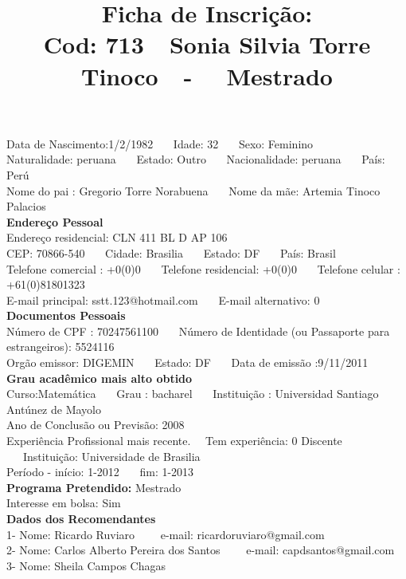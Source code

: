\documentclass[11pt]{article}
\title{\vspace*{-4cm} Ficha de Inscrição: \\Cod: 713\ \ Sonia Silvia Torre Tinoco\ \ - \ \ Mestrado 
 }
\date{}
\begin{document}
\maketitle
\vspace*{-1.5cm}
\noindent Data de Nascimento:1/2/1982
\ \ \ Idade: 32   \ \ \ Sexo: Feminino
\\
Naturalidade: peruana  
\ \ \  Estado: Outro
\ \ \  Nacionalidade: peruana
\ \ \ País: Perú
\\        
Nome do pai : Gregorio Torre Norabuena
\ \ \ Nome da mãe: Artemia Tinoco Palacios          
\\[0.2cm]                     
\textbf{Endereço Pessoal} 
\\ 
\noindent Endereço residencial: CLN 411 BL D AP 106
\\
        CEP: 70866-540 
\ \ \ Cidade: Brasilia 
\ \ \ Estado: DF 
\ \ \ País: Brasil
\\		
		Telefone comercial : +0(0)0
\ \ \ Telefone residencial: +0(0)0
\ \ \ Telefone celular : +61(0)81801323
\\
E-mail principal: sstt.123@hotmail.com
\ \ \ E-mail alternativo: 0 
\\[0.2cm] 
\textbf{Documentos Pessoais}
\\
\noindent Número de CPF : 70247561100
\ \ \ Número de Identidade (ou Passaporte para estrangeiros): 5524116
\\
Orgão emissor: DIGEMIN
\ \ \ Estado: DF
\ \ \ Data de emissão :9/11/2011
\\[0.3cm]
\textbf{Grau acadêmico mais alto obtido}
\\	
Curso:Matemática
\ \ \ Grau : bacharel
\ \ \ Instituição : Universidad Santiago Antúnez de Mayolo
\\			
Ano de Conclusão ou Previsão: 2008
\\ 
Experiência Profissional mais recente. \ \  
Tem experiência: 0 Discente  
\ \ \ Instituição: Universidade de Brasilia
\\  
Período - início: 1-2012
\ \ \ fim: 1-2013
\\[0.2cm] 
\textbf{Programa Pretendido:} Mestrado\\
Interesse em bolsa: Sim
\\[0.3cm]		
\textbf{Dados dos Recomendantes} 
\\
1- Nome: Ricardo Ruviaro
\ \ \ \  e-mail: ricardoruviaro@gmail.com 
\\
2- Nome: Carlos Alberto Pereira dos Santos
\ \ \ \ e-mail: capdsantos@gmail.com
\\
3- Nome: Sheila Campos Chagas
\end{document}
